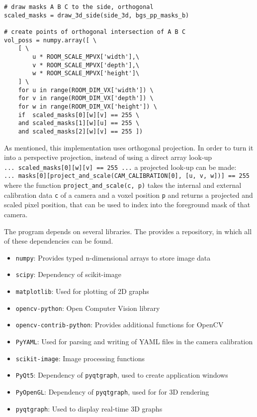 \begin{lstlisting}[caption={Orthogonal volume intersection implementation}, label={lst:impl:volintersect}]
# draw masks A B C to the side, orthogonal
scaled_masks = draw_3d_side(side_3d, bgs_pp_masks_b)

# create points of orthogonal intersection of A B C
vol_poss = numpy.array([ \
    [ \
        u * ROOM_SCALE_MPVX['width'],\
        v * ROOM_SCALE_MPVX['depth'],\
        w * ROOM_SCALE_MPVX['height']\
    ] \
    for u in range(ROOM_DIM_VX['width']) \
    for v in range(ROOM_DIM_VX['depth']) \
    for w in range(ROOM_DIM_VX['height']) \
    if  scaled_masks[0][w][v] == 255 \
    and scaled_masks[1][w][u] == 255 \
    and scaled_masks[2][w][v] == 255 ])
\end{lstlisting}

As mentioned, this implementation uses orthogonal projection.
In order to turn it into a perspective projection, instead of using a direct array look-up \\
\texttt{... scaled\_masks[0][w][v] == 255 ...} a projected look-up can be made:\\
\texttt{... masks[0][project\_and\_scale(CAM\_CALIBRATION[0], [u, v, w])] == 255} \\
where the function \texttt{project\_and\_scale(c, p)} takes the internal and external calibration data \texttt{c} of a camera and a voxel position \texttt{p} and returns a projected and scaled pixel position, that can be used to index into the foreground mask of that camera.

The program depends on several libraries.
The \textcite{python2018pypi} provides a repository, in which all of these dependencies can be found.
\begin{itemize}[noitemsep]
    \item \texttt{numpy}:  Provides typed n-dimensional arrays to store image data
    \item \texttt{scipy}:  Dependency of scikit-image
    \item \texttt{matplotlib}: Used for plotting of 2D graphs
    \item \texttt{opencv-python}: Open Computer Vision library
    \item \texttt{opencv-contrib-python}: Provides additional functions for OpenCV
    \item \texttt{PyYAML}: Used for parsing and writing of \ac{YAML} files in the camera calibration
    \item \texttt{scikit-image}: Image processing functions  
    \item \texttt{PyQt5}: Dependency of \texttt{pyqtgraph}, used to create application windows
    \item \texttt{PyOpenGL}: Dependency of \texttt{pyqtgraph}, used for for \ac{3D} rendering 
    \item \texttt{pyqtgraph}: Used to display real-time 3D graphs
\end{itemize}

